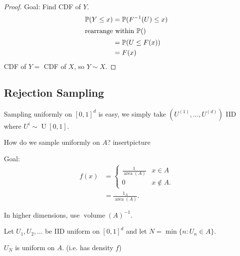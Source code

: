 \begin{proof}
    Goal: Find CDF of $Y$.
    \begin{align*}
        \mathbb{P}(Y \leq x) &= \mathbb{P}(F^{-1}(U) \leq x) \\
        \intertext{rearrange within $\mathbb{P}()$}
        &= \mathbb{P}(U \leq F(x)) \\
        &= F(x)
    \end{align*} 
    CDF of $Y =$ CDF of $X$, so $Y \sim X$.
\end{proof} 

\subsection{Rejection Sampling}

Sampling uniformly on $[0, 1]^d$ is easy, we simply take $(U^{(1)}, \dots, U^{(d)})$ IID where $U^i \sim \operatorname{U}[0, 1]$.

\begin{question}
    How do we sample uniformly on $A$?
    insertpicture
\end{question} 

Goal: \begin{align*}
    f(x) &= \begin{cases}
        \frac{1}{\operatorname{area}(A)} & x \in A \\
        0 & x \notin A.
    \end{cases} \\
    &= \frac{1_A}{\operatorname{area}(A)}.
\end{align*}

\color{blue} In higher dimensions, use  $\operatorname{volume}(A)^{-1}$. \color{black}

Let $U_1, U_2, \dots$ be IID uniform on $[0, 1]^d$ and let $N = \min \{n : U_n \in A\}$.

\begin{claim}
    $U_N$ is uniform on $A$. (i.e. has density $f$)
\end{claim} 

